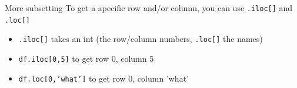 \documentclass{beamer}
\begin{document}
\begin{frame}{More subsetting}
	To get a apecific row and/or column, you can use \texttt{.iloc[]} and \texttt{.loc[]}
\begin{itemize}[<+->]
	\item \texttt{.iloc[]} takes an int (the row/column numbers, \texttt{.loc[]} the names)
	\item \texttt{df.iloc[0,5]} to get row 0, column 5
	\item \texttt{df.loc[0,'what']} to get row 0, column 'what'
\end{itemize}

\end{frame}


{
\begin{frame}[plain]
\end{frame}

\begin{frame}[plain]
\end{frame}
}
\end{document}
